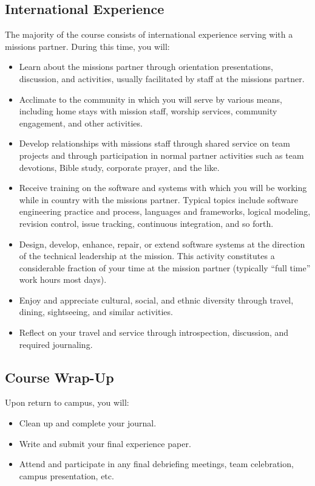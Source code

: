 \documentclass{article}
\begin{document}
\subsection{International Experience}
\label{sec:orgheadline5}
The majority of the course consists of international experience serving with a missions
partner.  During this time, you will:
\begin{itemize}
\item Learn about the missions partner through orientation presentations, discussion, and
activities, usually facilitated by staff at the missions partner.
\item Acclimate to the community in which you will serve by various means, including home
stays with mission staff, worship services, community engagement, and other activities.
\item Develop relationships with missions staff through shared service on team projects and
through participation in normal partner activities such as team devotions, Bible study,
corporate prayer, and the like.
\item Receive training on the software and systems with which you will be working while in
country with the missions partner.  Typical topics include software engineering practice
and process, languages and frameworks, logical modeling, revision control, issue
tracking, continuous integration, and so forth.
\item Design, develop, enhance, repair, or extend software systems at the direction of the
technical leadership at the mission.  This activity constitutes a considerable fraction
of your time at the mission partner (typically ``full time'' work hours most days).
\item Enjoy and appreciate cultural, social, and ethnic diversity through travel,
dining, sightseeing, and similar activities.
\item Reflect on your travel and service through introspection, discussion, and required
journaling.
\end{itemize}
\subsection{Course Wrap-Up}
\label{sec:orgheadline6}
Upon return to campus, you will:
\begin{itemize}
\item Clean up and complete your journal.
\item Write and submit your final experience paper.
\item Attend and participate in any final debriefing meetings, team celebration, campus
presentation, etc.
\end{itemize}
\end{document}
